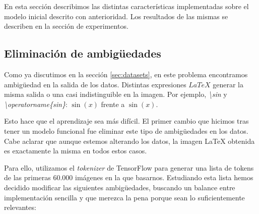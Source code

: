 \documentclass[a4paper, 20pt, dvipsnames]{article}
\begin{document}
En esta sección describimos las distintas características implementadas sobre el
modelo inicial descrito con anterioridad. Los resultados de las mismas se
describen en la sección de experimentos.


\subsection{Eliminación de ambigüedades}
\label{feature:rem-amb}

Como ya discutimos en la sección \ref{sec:datasets}, en este problema
encontramos ambigüedad en la salida de los datos. Distintas expresiones $LaTeX$
generar la misma salida o una casi indistinguible en la imagen. Por ejemplo,
\emph{\textbackslash sin} y \emph{\textbackslash operatorname\{sin\}}: $\sin(x)$
frente a $\operatorname{sin}(x)$.

Esto hace que el aprendizaje sea más difícil. El primer cambio que hicimos tras
tener un modelo funcional fue eliminar este tipo de ambigüedades en los
datos. Cabe aclarar que aunque estemos alterando los datos, la imagen \LaTeX{}
obtenida es exactamente la misma en todos estos casos.

Para ello, utilizamos el \emph{tokenizer} de TensorFlow \cite{tokenizer} para
generar una lista de tokens de las primeras 60.000 imágenes en la que
basarnos. Estudiando esta lista hemos decidido modificar las siguientes
ambigüedades, buscando un balance entre implementación sencilla y que merezca la
pena porque sean lo suficientemente relevantes:
\end{document}

